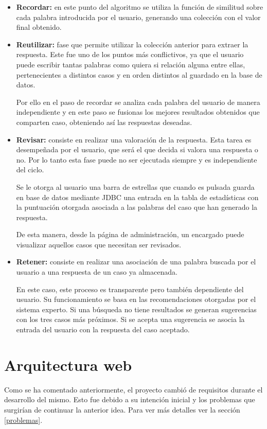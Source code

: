 \begin{itemize}
\tightlist
\item
\textbf{Recordar:} en este punto del algoritmo se utiliza la función de similitud sobre cada palabra introducida por el usuario, generando una colección con el valor final obtenido.
\item
\textbf{Reutilizar:} fase que permite utilizar la colección anterior para extraer la respuesta. Este fue uno de los puntos más conflictivos, ya que el usuario puede escribir tantas palabras como quiera si relación alguna entre ellas, pertenecientes a distintos casos y en orden distintos al guardado en la base de datos.

Por ello en el paso de recordar se analiza cada palabra del usuario de manera independiente y en este paso se fusionas los mejores resultados obtenidos que comparten caso, obteniendo así las respuestas deseadas.
\item
\textbf{Revisar:} consiste en realizar una valoración de la respuesta. Esta tarea es desempeñada por el usuario, que será el que decida si valora una respuesta o no. Por lo tanto esta fase puede no ser ejecutada siempre y es independiente del ciclo.

Se le otorga al usuario una barra de estrellas que cuando es pulsada guarda en base de datos mediante JDBC una entrada en la tabla de estadísticas con la puntuación otorgada asociada a las palabras del caso que han generado la respuesta. 

De esta manera, desde la página de administración, un encargado puede visualizar aquellos casos que necesitan ser revisados.
\item
\textbf{Retener:} consiste en realizar una asociación de una palabra buscada por el usuario a una respuesta de un caso ya almacenada.

En este caso, este proceso es transparente pero también dependiente del usuario. Su funcionamiento se basa en las recomendaciones otorgadas por el sistema experto. Si una búsqueda no tiene resultados se generan sugerencias con los tres casos más próximos. Si se acepta una sugerencia se asocia la entrada del usuario con la respuesta del caso aceptado.
\end{itemize}

\section{Arquitectura web}

Como se ha comentado anteriormente, el proyecto cambió de requisitos durante el desarrollo del mismo. Esto fue debido a su intención inicial y los problemas que surgirían de continuar la anterior idea. Para ver más detalles ver la sección \ref{problemas}.

